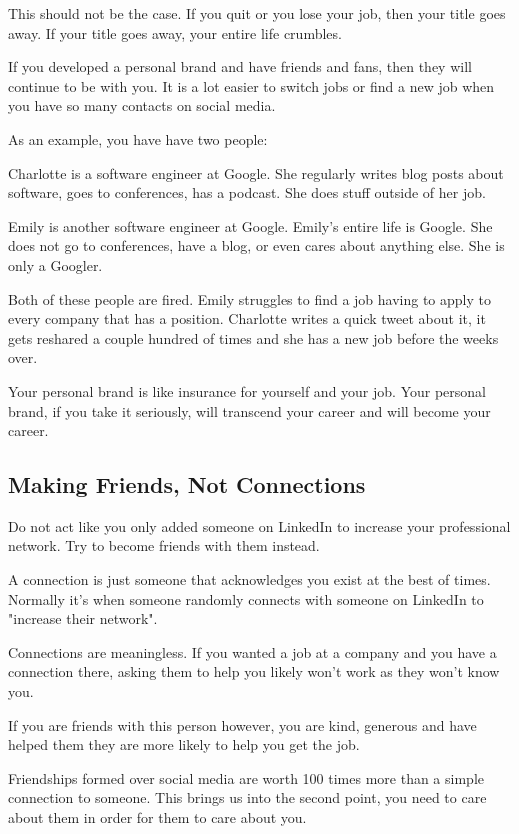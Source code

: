 \documentclass{article}
\begin{document}
This should not be the case. If you quit or you lose your job, then your
title goes away. If your title goes away, your entire life crumbles.

If you developed a personal brand and have friends and fans, then they
will continue to be with you. It is a lot easier to switch jobs or find
a new job when you have so many contacts on social media.

As an example, you have have two people:

Charlotte is a software engineer at Google. She regularly writes blog
posts about software, goes to conferences, has a podcast. She does stuff
outside of her job.

Emily is another software engineer at Google. Emily's entire life is
Google. She does not go to conferences, have a blog, or even cares about
anything else. She is only a Googler.

Both of these people are fired. Emily struggles to find a job having to
apply to every company that has a position. Charlotte writes a quick
tweet about it, it gets reshared a couple hundred of times and she has a
new job before the weeks over.

Your personal brand is like insurance for yourself and your job. Your
personal brand, if you take it seriously, will transcend your career and
will become your career.

\subsection{Making Friends, Not Connections}

Do not act like you only added someone on LinkedIn to increase your
professional network. Try to become friends with them instead.

A connection is just someone that acknowledges you exist at the best of
times. Normally it's when someone randomly connects with someone on
LinkedIn to "increase their network".

Connections are meaningless. If you wanted a job at a company and you
have a connection there, asking them to help you likely won't work as
they won't know you.

If you are friends with this person however, you are kind, generous and
have helped them they are more likely to help you get the job.

Friendships formed over social media are worth 100 times more than a
simple connection to someone. This brings us into the second point, you
need to care about them in order for them to care about you.
\end{document}
